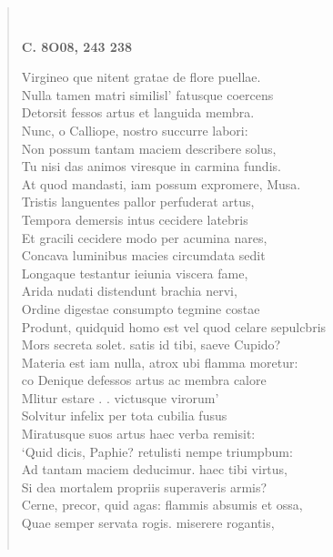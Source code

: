 \documentclass[11pt, a4paper]{report}
\begin{document}
\begin{verse}
        ﻿\pagebreak 
    \begin{center} \textbf{C. 8O08, 243 238} \end{center} \marginpar{[295]} Virgineo \lbrack que \rbrack  nitent gratae de flore puellae. \\ Nulla tamen matri similisl’ fatusque coercens \\ Detorsit fessos artus et languida membra. \\ Nunc, o Calliope, nostro succurre labori: \\ Non possum tantam maciem describere solus, \\ Tu nisi das animos viresque in carmina fundis. \\  \lbrack At quod \rbrack  mandasti, iam possum expromere, Musa. \\ Tristis languentes pallor perfuderat artus, \\ Tempora demersis intus cecidere latebris \\ Et gracili cecidere modo per acumina nares, \\ Concava luminibus macies circumdata sedit \\ Longaque testantur ieiunia viscera fame, \\ Arida nudati distendunt brachia nervi, \\ Ordine digestae consumpto tegmine costae \\ Produnt, quidquid homo est vel quod celare sepulcbris \\ Mors secreta solet. satis id tibi, saeve Cupido? \\ Materia est iam nulla, atrox ubi flamma moretur: \\ co Denique defessos artus ac membra calore \\ Mlitur estare . . victusque virorum’ \\ Solvitur infelix per tota cubilia fusus \\ Miratusque suos artus haec verba remisit: \\ ‘Quid dicis, Paphie? retulisti nempe triumpbum: \\ Ad tantam maciem deducimur. haec tibi virtus, \\ Si dea mortalem propriis superaveris armis? \\ Cerne, precor, quid agas: flammis absumis et ossa, \\ Quae semper servata rogis. miserere rogantis, \\ 
        ﻿\pagebreak 

\end{verse}
\end{document}

